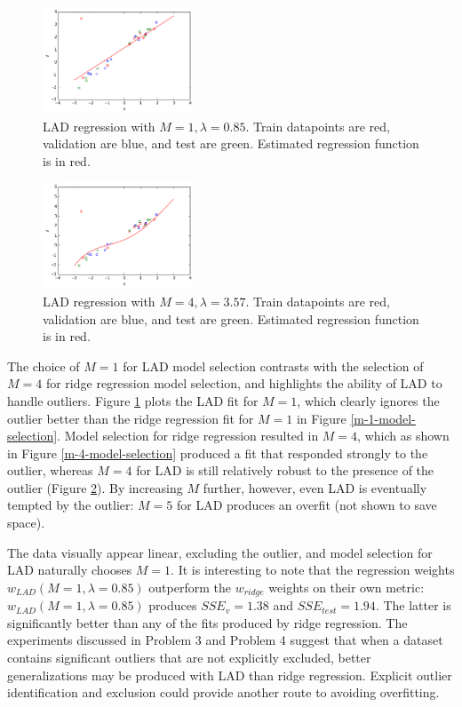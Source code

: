 \documentclass[10pt]{article}
\begin{document}
\begin{figure}[ht]
\centering
\includegraphics[width=0.4\textwidth]{m_1_SAE}
\caption{LAD regression with $M = 1, \lambda = 0.85$. Train datapoints are red, validation are blue, and test are green. Estimated regression function is in red.}
\label{m-1-model-selection-SAE}
\end{figure}
\begin{figure}[h]
%
\centering
\includegraphics[width=0.4\textwidth]{m_4_SAE}
\caption{LAD regression with $M = 4, \lambda = 3.57$. Train datapoints are red, validation are blue, and test are green. Estimated regression function is in red.}
\label{m-4-model-selection-SAE}
\end{figure}
%
%

The choice of $M=1$ for LAD model selection contrasts with the selection of $M=4$ for ridge regression model selection, and highlights the ability of LAD to handle outliers.  Figure \ref{m-1-model-selection-SAE} plots the LAD fit for $M=1$, which clearly ignores the outlier better than the ridge regression fit for $M=1$ in Figure \ref{m-1-model-selection}.  Model selection for ridge regression resulted in $M=4$, which as shown in Figure \ref{m-4-model-selection} produced a fit that responded strongly to the outlier, whereas $M=4$ for LAD is still relatively robust to the presence of the outlier (Figure \ref{m-4-model-selection-SAE}).  By increasing $M$ further, however, even LAD is eventually tempted by the outlier: $M=5$ for LAD produces an overfit (not shown to save space).  

The data visually appear linear, excluding the outlier, and model selection for LAD naturally chooses $M=1$.  It is interesting to note that the regression weights $w_{LAD}(M=1,\lambda=0.85)$ outperform the $w_{ridge}$ weights on their own metric: $w_{LAD}(M=1,\lambda=0.85)$ produces $SSE_{v}=1.38$ and $SSE_{test}=1.94$. The latter is significantly better than any of the fits produced by ridge regression.  The experiments discussed in Problem 3 and Problem 4 suggest that when a dataset contains significant outliers that are not explicitly excluded, better generalizations may be produced with LAD than ridge regression.  Explicit outlier identification and exclusion could provide another route to avoiding overfitting.
\end{document}
